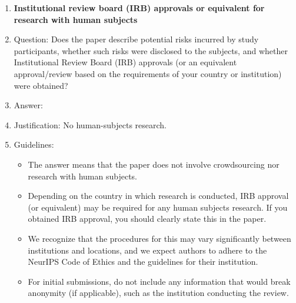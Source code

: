 \documentclass[
]{article}
\begin{document}
\begin{enumerate}
\item {\bf Institutional review board (IRB) approvals or equivalent for research with human subjects}
    \item[] Question: Does the paper describe potential risks incurred by study participants, whether such risks were disclosed to the subjects, and whether Institutional Review Board (IRB) approvals (or an equivalent approval/review based on the requirements of your country or institution) were obtained?
    \item[] Answer: \answerNA{} %
    \item[] Justification: No human-subjects research.
    \item[] Guidelines:
    \begin{itemize}
        \item The answer \answerNA{} means that the paper does not involve crowdsourcing nor research with human subjects.
        \item Depending on the country in which research is conducted, IRB approval (or equivalent) may be required for any human subjects research. If you obtained IRB approval, you should clearly state this in the paper. 
        \item We recognize that the procedures for this may vary significantly between institutions and locations, and we expect authors to adhere to the NeurIPS Code of Ethics and the guidelines for their institution. 
        \item For initial submissions, do not include any information that would break anonymity (if applicable), such as the institution conducting the review.
    \end{itemize}


\end{enumerate}
\end{document}
